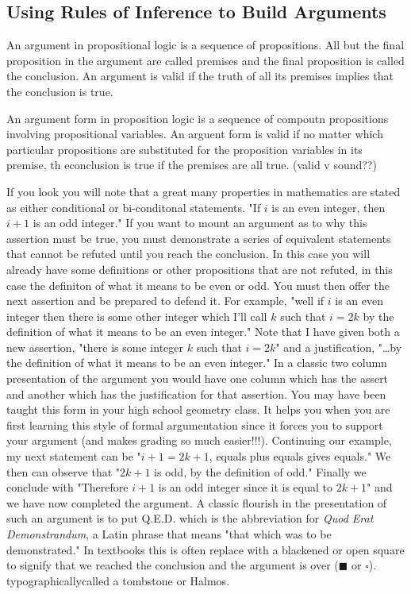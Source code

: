    \subsection {Using Rules of Inference to Build Arguments}
\begin{definition}
An argument in propositional logic is a sequence of propositions. All but the final proposition in the argument are called premises and the final proposition is called the conclusion. An argument is valid if the truth of all its premises implies that the conclusion is true.

An argument form in proposition logic is a sequence of compoutn propositions involving propositional variables. An arguent form is valid if no matter which particular propositions are substituted for the proposition variables in its premise, th econclusion is true if the premises are all true. (valid v sound??)
\end{definition}


If you look you will note that a great many properties in mathematics are stated as either conditional or bi-conditonal statements. "If $i$ is an even integer, then $i+1$ is an odd integer." If you want to mount an argument as to why this assertion must be true, you must demonstrate a series of equivalent statements that cannot be refuted until you reach the conclusion. In this case you will already have some definitions or other propositions that are not refuted, in this case the definiton of what it means to be even or odd. You must then offer the next assertion and be prepared to defend it. For example, "well if $i$ is an even integer then there is some other integer which I'll call $k$ such that $i=2k$ by the definition of what it means to be an even integer." Note that I have given both a new assertion, "there is some integer $k$ such that $i=2k$" and a justification, "\dots by the definition of what it means to be an even integer." In a classic two column presentation of the argument you would have one column which has the assert and another which has the justification for that assertion. You may have been taught this form in your high school geometry class. It helps you when you are first learning this style of formal argumentation since it forces you to support your argument (and makes grading so much easier!!!). Continuing our example, my next statement can be "$i+1=2k+1$, equals plus equals gives equals." We then can observe that "$2k+1$ is odd, by the definition of odd." Finally we conclude with "Therefore $i+1$ is an odd integer since it is equal to $2k+1$" and we have now completed the argument. A classic flourish in the presentation of such an argument is to put Q.E.D. which is the abbreviation for \textit{Quod Erat Demonstrandum}, a Latin phrase that means "that which was to be demonstrated." In textbooks this is often replace with a blackened or open square to signify that we reached the conclusion and the argument is over ($\blacksquare$ or $\square$). typographicallycalled a tombstone or Halmos.


